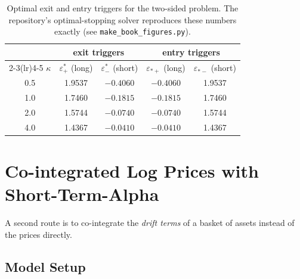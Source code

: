 \documentclass[11pt]{article}
\newcommand{\eps}{\varepsilon}
\begin{document}
\begin{table}[ht]
  \centering
  \begin{tabular}{ccccc}
    \toprule
    & \multicolumn{2}{c}{exit triggers} & \multicolumn{2}{c}{entry triggers}\\
    \cmidrule(lr){2-3}\cmidrule(lr){4-5}
    $\kappa$ & $\eps^*_+$ (long) & $\eps^*_-$ (short) & $\eps_{*+}$ (long) & $\eps_{*-}$ (short)\\
    \midrule
    0.5 & 1.9537 & $-0.4060$ & $-0.4060$ & 1.9537\\
    1.0 & 1.7460 & $-0.1815$ & $-0.1815$ & 1.7460\\
    2.0 & 1.5744 & $-0.0740$ & $-0.0740$ & 1.5744\\
    4.0 & 1.4367 & $-0.0410$ & $-0.0410$ & 1.4367\\
    \bottomrule
  \end{tabular}
  \caption{Optimal exit and entry triggers for the two-sided problem. The repository's optimal-stopping
  solver reproduces these numbers exactly (see \texttt{make\_book\_figures.py}).}
  \label{tab:triggers}
\end{table}

\section{Co-integrated Log Prices with Short-Term-Alpha}\label{sec:sta}

A second route is to co-integrate the \emph{drift terms} of a basket of assets instead of the prices
directly.

\subsection{Model Setup}
\end{document}
